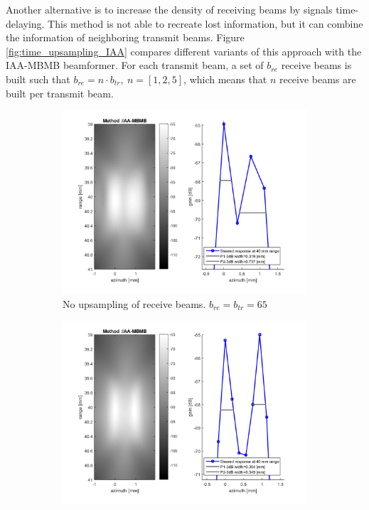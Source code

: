 Another alternative is to increase the density of receiving beams by signals time-delaying. This method is not able to recreate lost information, but it can combine the information of neighboring transmit beams.
Figure \ref{fig:time_upsampling_IAA} compares different variants of this approach with the IAA-MBMB beamformer. For each transmit beam, a set of $b_{re}$ receive beams is built such that $b_{re} = n \cdot b_{tr}, ~n = [1, 2, 5]$, which means that $n$ receive beams are built per transmit beam.

\begin{figure}[ht]
    \centering
    \begin{subfigure}[t]{0.48\linewidth}
        \includegraphics[width=\linewidth]{./images/discussion/IAA-MBMB-standard.png}
        \caption{No upsampling of receive beams. $b_{re} = b_{tr} = 65$}
    \end{subfigure}
        \label{fig:time1}
    \quad
    \begin{subfigure}[t]{0.48\linewidth}
        \includegraphics[width=\linewidth]{./images/discussion/IAA-MBMB-time2.png}

\end{subfigure}
\end{figure}
